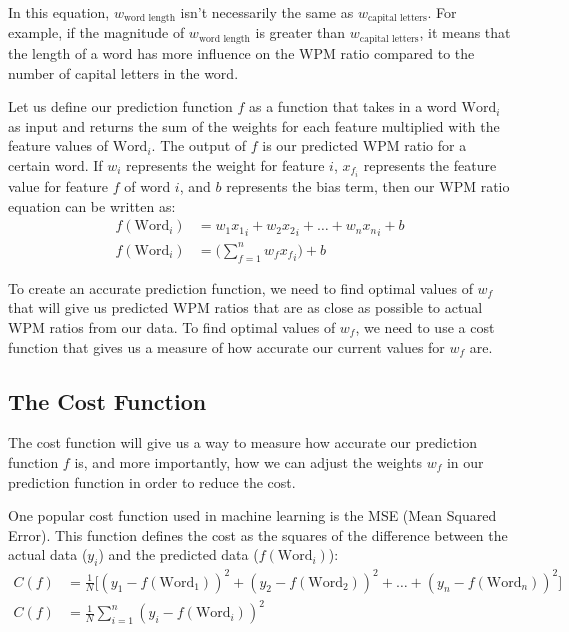\documentclass[12pt]{article}
\begin{document}
In this equation, $w_{\text{word length}}$ isn't necessarily the same as $w_{\text{capital letters}}$. For example, if the magnitude of $w_{\text{word length}}$ is greater than $w_{\text{capital letters}}$, it means that the length of a word has more influence on the WPM ratio compared to the number of capital letters in the word.

Let us define our prediction function $f$ as a function that takes in a word $\text{Word}_i$ as input and returns the sum of the weights for each feature multiplied with the feature values of $\text{Word}_i$. The output of $f$ is our predicted WPM ratio for a certain word. If $w_i$ represents the weight for feature $i$, $x_{f_i}$ represents the feature value for feature $f$ of word $i$, and $b$ represents the bias term, then our WPM ratio equation can be written as:
\begin{align*}
	f(\text{Word}_i) & = w_1{x_1}_i + w_2{x_2}_i + \dots + w_n{x_n}_i + b
	\\
	f(\text{Word}_i) & = \Big(\sum_{f=1}^{n} w_f{x_f}_i\Big) + b
\end{align*}

To create an accurate prediction function, we need to find optimal values of $w_f$ that will give us predicted WPM ratios that are as close as possible to actual WPM ratios from our data. To find optimal values of $w_f$, we need to use a cost function that gives us a measure of how accurate our current values for $w_f$ are.

\subsection*{The Cost Function}

The cost function will give us a way to measure how accurate our prediction function $f$ is, and more importantly, how we can adjust the weights $w_f$ in our prediction function in order to reduce the cost.

One popular cost function used in machine learning is the MSE (Mean Squared Error). This function defines the cost as the squares of the difference between the actual data ($y_i$) and the predicted data ($f(\text{Word}_i)$):
\begin{align*}
	C(f) & = \frac{1}{N}\big[(y_1 - f(\text{Word}_1))^2 + (y_2 - f(\text{Word}_2))^2 + \dots + (y_n - f(\text{Word}_n))^2]
	\\
	C(f) & = \frac{1}{N} \sum_{i=1}^{n} (y_i - f(\text{Word}_i))^2
\end{align*}
\end{document}
